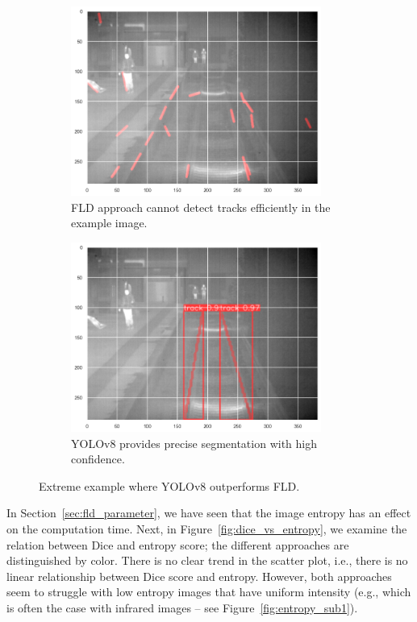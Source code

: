 \documentclass[Master,MDS,english]{BASE/twbook} %
\begin{document}
\begin{figure}
\centering
\begin{subfigure}{.5\textwidth}
  \centering
  \includegraphics[width=0.9\textwidth]{images/results/example_4_fld}
  \caption{FLD approach cannot detect tracks efficiently in the example image.}
\end{subfigure}%
\begin{subfigure}{.5\textwidth}
  \centering
  \includegraphics[width=0.9\textwidth]{images/results/example_4_yolo}
  \caption{YOLOv8 provides precise segmentation with high confidence. }
\end{subfigure}
\caption{Extreme example where YOLOv8 outperforms FLD.}
\label{fig:res_example4}
\end{figure}


In Section~\ref{sec:fld_parameter}, we have seen that the image entropy has an effect on the computation time. Next, in Figure~\ref{fig:dice_vs_entropy}, we examine the relation between Dice and entropy score; the different approaches are distinguished by color. There is no clear trend in the scatter plot, i.e., there is no linear relationship between Dice score and entropy. However,  both approaches seem to struggle with low entropy images that have uniform intensity  (e.g., which is often the case with infrared images -- see Figure~\ref{fig:entropy_sub1}).
\end{document}

